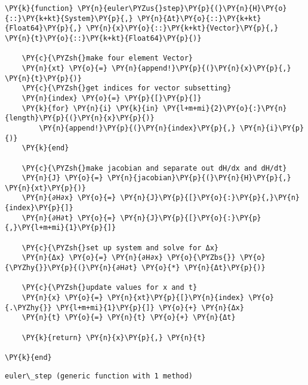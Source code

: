 \documentclass[11pt]{article}
\begin{document}
    \begin{tcolorbox}[breakable, size=fbox, boxrule=1pt, pad at break*=1mm,colback=cellbackground, colframe=cellborder]
\begin{Verbatim}[commandchars=\\\{\}]
\PY{k}{function} \PY{n}{euler\PYZus{}step}\PY{p}{(}\PY{n}{H}\PY{o}{::}\PY{k+kt}{System}\PY{p}{,} \PY{n}{Δt}\PY{o}{::}\PY{k+kt}{Float64}\PY{p}{,} \PY{n}{x}\PY{o}{::}\PY{k+kt}{Vector}\PY{p}{,} \PY{n}{t}\PY{o}{::}\PY{k+kt}{Float64}\PY{p}{)}
    
    \PY{c}{\PYZsh{}make four element Vector}
    \PY{n}{xt} \PY{o}{=} \PY{n}{append!}\PY{p}{(}\PY{n}{x}\PY{p}{,} \PY{n}{t}\PY{p}{)}
    \PY{c}{\PYZsh{}get indices for vector subsetting}
    \PY{n}{index} \PY{o}{=} \PY{p}{[}\PY{p}{]}
    \PY{k}{for} \PY{n}{i} \PY{k}{in} \PY{l+m+mi}{2}\PY{o}{:}\PY{n}{length}\PY{p}{(}\PY{n}{x}\PY{p}{)}
        \PY{n}{append!}\PY{p}{(}\PY{n}{index}\PY{p}{,} \PY{n}{i}\PY{p}{)}
    \PY{k}{end}

    \PY{c}{\PYZsh{}make jacobian and separate out dH/dx and dH/dt}
    \PY{n}{J} \PY{o}{=} \PY{n}{jacobian}\PY{p}{(}\PY{n}{H}\PY{p}{,} \PY{n}{xt}\PY{p}{)}
    \PY{n}{∂H∂x} \PY{o}{=} \PY{n}{J}\PY{p}{[}\PY{o}{:}\PY{p}{,}\PY{n}{index}\PY{p}{]}
    \PY{n}{∂H∂t} \PY{o}{=} \PY{n}{J}\PY{p}{[}\PY{o}{:}\PY{p}{,}\PY{l+m+mi}{1}\PY{p}{]}

    \PY{c}{\PYZsh{}set up system and solve for Δx}
    \PY{n}{Δx} \PY{o}{=} \PY{n}{∂H∂x} \PY{o}{\PYZbs{}} \PY{o}{\PYZhy{}}\PY{p}{(}\PY{n}{∂H∂t} \PY{o}{*} \PY{n}{Δt}\PY{p}{)}

    \PY{c}{\PYZsh{}update values for x and t}
    \PY{n}{x} \PY{o}{=} \PY{n}{xt}\PY{p}{[}\PY{n}{index} \PY{o}{.\PYZhy{}} \PY{l+m+mi}{1}\PY{p}{]} \PY{o}{+} \PY{n}{Δx}
    \PY{n}{t} \PY{o}{=} \PY{n}{t} \PY{o}{+} \PY{n}{Δt}

    \PY{k}{return} \PY{n}{x}\PY{p}{,} \PY{n}{t}

\PY{k}{end}
\end{Verbatim}
\end{tcolorbox}

            \begin{tcolorbox}[breakable, size=fbox, boxrule=.5pt, pad at break*=1mm, opacityfill=0]
\begin{Verbatim}[commandchars=\\\{\}]
euler\_step (generic function with 1 method)
\end{Verbatim}
\end{tcolorbox}
        
\end{document}
